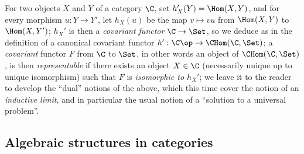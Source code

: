 \begin{env}[8.1.11]
\label{0.8.1.11}
For two objects $X$ and $Y$ of a category $\C$, set $h_X'(Y)=\Hom(X,Y)$, and for every morphism $u:Y\to Y'$, let $h_X(u)$ be the map $v\mapsto vu$ from $\Hom(X,Y)$ to $\Hom(X,Y')$; $h_X'$ is then a \emph{covariant functor $\C\to\Set$}, so we deduce as in  the definition of a canonical covariant functor $h':\C\op\to\CHom(\C,\Set)$; a \emph{covariant} functor $F$ from $\C$ to $\Set$, in other words an object of $\CHom(\C,\Set)$, is then \emph{representable} if there exists an object $X\in\C$ (necessarily unique up to unique isomorphism) such that $F$ is \emph{isomorphic to $h_X'$}; we leave it to the reader to develop the ``dual'' notions of the above, which this time cover the notion of an \emph{inductive limit}, and in particular the usual notion of a ``solution to a universal problem''.
\end{env}

\subsection{Algebraic structures in categories}
\label{subsection:0.8.2}

